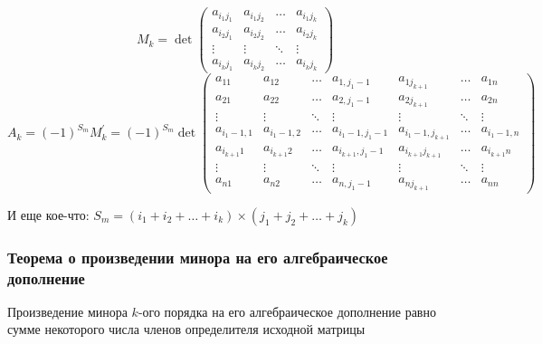 \documentclass[class=article,a4paper,12pt,crop=false]{standalone}
\begin{document}
\begin{equation}
  M_k = \det{
    \begin{pmatrix}
      a_{i_1j_1} & a_{i_1j_2} & \dots & a_{i_1j_k} \\
      a_{i_2j_1} & a_{i_2j_2} & \dots & a_{i_2j_k} \\
      \vdots & \vdots & \ddots & \vdots \\
      a_{i_kj_1} & a_{i_kj_2} & \dots & a_{i_kj_k}
    \end{pmatrix}
  }
\end{equation}
\begin{equation}
  A_k = (-1)^{S_m}M_k^{'} = (-1)^{S_m}\det{
    \begin{pmatrix}
      a_{11} & a_{12} & \dots & a_{1,j_1-1} & a_{1j_{k+1}} & \dots & a_{1n} \\
      a_{21} & a_{22} & \dots & a_{2,j_1-1} & a_{2j_{k+1}} & \dots & a_{2n} \\
      \vdots & \vdots & \ddots & \vdots & \vdots & \ddots & \vdots \\
      a_{i_1-1,1} & a_{i_1-1,2} & \dots & a_{i_1-1,j_1-1} & a_{i_1-1,j_{k+1}} & \dots & a_{i_1-1,n} \\
      a_{i_{k+1}1} & a_{i_{k+1}2} & \dots & a_{i_{k+1},j_1-1} & a_{i_{k+1}j_{k+1}} & \dots & a_{i_{k+1}n} \\
      \vdots & \vdots & \ddots & \vdots & \vdots & \ddots & \vdots \\
      a_{n1} & a_{n2} & \dots & a_{n,j_1-1} & a_{nj_{k+1}} & \dots & a_{nn}
    \end{pmatrix}
  }
\end{equation}

И еще кое-что: $S_m = (i_1+i_2+\dots+i_k) \times (j_1+j_2+\dots+j_k)$

\subsubsection{Теорема о произведении минора на его алгебраическое дополнение}

Произведение минора $k$-ого порядка на его алгебраическое дополнение равно сумме некоторого числа членов определителя исходной матрицы
\end{document}
